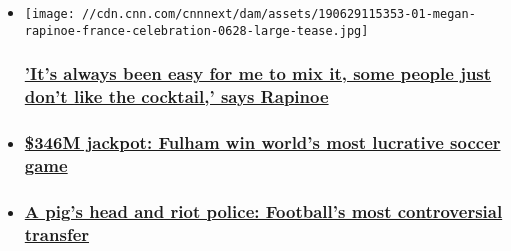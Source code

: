 \begin{itemize}
\item
  \href{/2020/08/05/football/megan-rapinoe-uswnt-activism-spt-intl/index.html}{}

  \texttt{[image: //cdn.cnn.com/cnnnext/dam/assets/190629115353-01-megan-rapinoe-france-celebration-0628-large-tease.jpg]}

  \hypertarget{its-always-been-easy-for-me-to-mix-it-some-people-just-dont-like-the-cocktail-says-rapinoe}{%
  \subsubsection{\texorpdfstring{\href{/2020/08/05/football/megan-rapinoe-uswnt-activism-spt-intl/index.html}{'It's
  always been easy for me to mix it, some people just don't like the
  cocktail,' says
  Rapinoe}}{'It's always been easy for me to mix it, some people just don't like the cocktail,' says Rapinoe}}\label{its-always-been-easy-for-me-to-mix-it-some-people-just-dont-like-the-cocktail-says-rapinoe}}
\item
  \hypertarget{346m-jackpot-fulham-win-worlds-most-lucrative-soccer-game-}{%
  \subsubsection{\texorpdfstring{\href{/2020/08/04/football/championship-playoff-fulham-brentford-premier-league-spt-intl/index.html}{\$346M
  jackpot: Fulham win world's most lucrative soccer game
  }}{\$346M jackpot: Fulham win world's most lucrative soccer game }}\label{346m-jackpot-fulham-win-worlds-most-lucrative-soccer-game-}}
\item
  \hypertarget{a-pigs-head-and-riot-police-footballs-most-controversial-transfer}{%
  \subsubsection{\texorpdfstring{\href{/2020/07/24/football/luis-figo-barcelona-real-madrid-transfer-spt-intl-cmd/index.html}{A
  pig's head and riot police: Football's most controversial
  transfer}}{A pig's head and riot police: Football's most controversial transfer}}\label{a-pigs-head-and-riot-police-footballs-most-controversial-transfer}}
\end{itemize}

